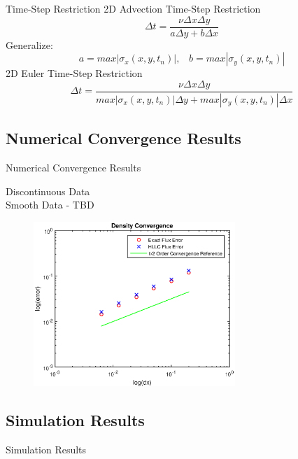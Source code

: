 \documentclass{beamer}
\newcommand{\bq}{\begin{equation}}
\newcommand{\eq}{\end{equation}}
\begin{document}
\begin{frame}{Time-Step Restriction}
2D Advection Time-Step Restriction
\bq \Delta t=\frac{\nu \Delta x\Delta y}{a\Delta y+b\Delta x}\eq
Generalize:
\bq a=max|\sigma_x(x,y,t_n)|,\;\;\; b=max|\sigma_y(x,y,t_n)|\eq
2D Euler Time-Step Restriction
\bq \Delta t=\frac{\nu \Delta x \Delta y}{max|\sigma_x(x,y,t_n)|\Delta y+max|\sigma_y(x,y,t_n)|\Delta x}\eq
\end{frame}

\subsection{Numerical Convergence Results}
\begin{frame}{Numerical Convergence Results}
\begin{multicols}{2}
Discontinuous Data
\\
Smooth Data - TBD
\end{multicols}
\begin{figure}[h]
\centering
\includegraphics[width=3in]{eulerconv1}
\end{figure}
\end{frame}

\subsection{Simulation Results}
\begin{frame}{Simulation Results}

\end{frame} 
\end{document}

